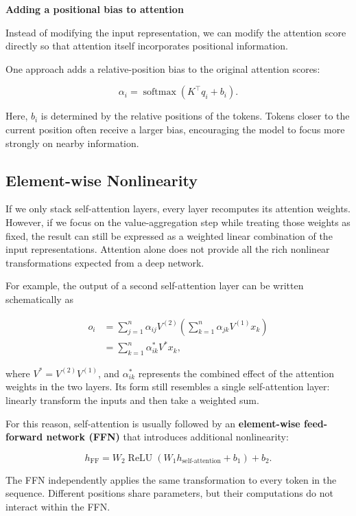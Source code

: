 \documentclass[
  a4paper,
  10pt]{article}
\begin{document}
\textbf{Adding a positional bias to attention}

Instead of modifying the input representation, we can modify the
attention score directly so that attention itself incorporates
positional information.

One approach adds a relative-position bias to the original attention
scores:

\[
\alpha_i=\operatorname{softmax}\left(K^\top q_i+b_i\right).
\]

Here, \(b_i\) is determined by the relative positions of the tokens.
Tokens closer to the current position often receive a larger bias,
encouraging the model to focus more strongly on nearby information.

\subsection{Element-wise Nonlinearity}\label{element-wise-nonlinearity}

If we only stack self-attention layers, every layer recomputes its
attention weights. However, if we focus on the value-aggregation step
while treating those weights as fixed, the result can still be expressed
as a weighted linear combination of the input representations. Attention
alone does not provide all the rich nonlinear transformations expected
from a deep network.

For example, the output of a second self-attention layer can be written
schematically as

\[
\begin{aligned}
o_i
&=\sum_{j=1}^{n}\alpha_{ij}V^{(2)}
\left(\sum_{k=1}^{n}\alpha_{jk}V^{(1)}x_k\right)\\
&=\sum_{k=1}^{n}\alpha_{ik}^{*}V^{*}x_k,
\end{aligned}
\]

where \(V^{*}=V^{(2)}V^{(1)}\), and \(\alpha_{ik}^{*}\) represents the
combined effect of the attention weights in the two layers. Its form
still resembles a single self-attention layer: linearly transform the
inputs and then take a weighted sum.

For this reason, self-attention is usually followed by an
\textbf{element-wise feed-forward network (FFN)} that introduces
additional nonlinearity:

\[
h_{\mathrm{FF}}
=W_2\operatorname{ReLU}\left(
W_1h_{\mathrm{self\text{-}attention}}+b_1
\right)+b_2.
\]

The FFN independently applies the same transformation to every token in
the sequence. Different positions share parameters, but their
computations do not interact within the FFN.
\end{document}
